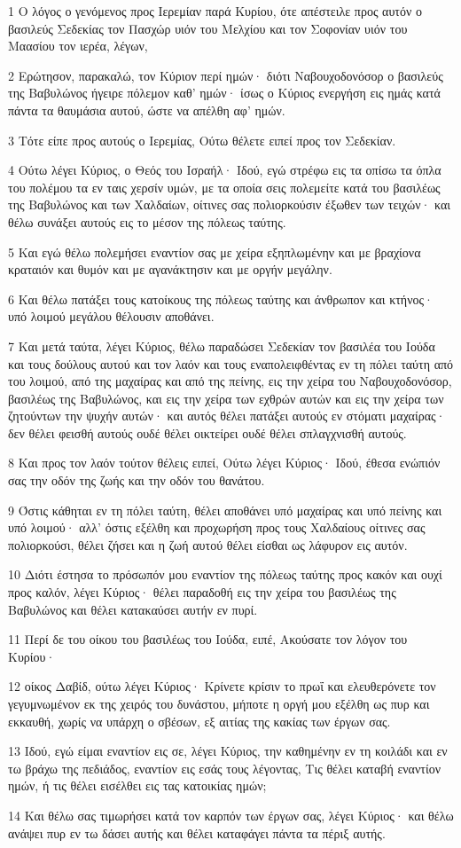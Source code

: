 \par 1 Ο λόγος ο γενόμενος προς Ιερεμίαν παρά Κυρίου, ότε απέστειλε προς αυτόν ο βασιλεύς Σεδεκίας τον Πασχώρ υιόν του Μελχίου και τον Σοφονίαν υιόν του Μαασίου τον ιερέα, λέγων,
\par 2 Ερώτησον, παρακαλώ, τον Κύριον περί ημών· διότι Ναβουχοδονόσορ ο βασιλεύς της Βαβυλώνος ήγειρε πόλεμον καθ' ημών· ίσως ο Κύριος ενεργήση εις ημάς κατά πάντα τα θαυμάσια αυτού, ώστε να απέλθη αφ' ημών.
\par 3 Τότε είπε προς αυτούς ο Ιερεμίας, Ούτω θέλετε ειπεί προς τον Σεδεκίαν.
\par 4 Ούτω λέγει Κύριος, ο Θεός του Ισραήλ· Ιδού, εγώ στρέφω εις τα οπίσω τα όπλα του πολέμου τα εν ταις χερσίν υμών, με τα οποία σεις πολεμείτε κατά του βασιλέως της Βαβυλώνος και των Χαλδαίων, οίτινες σας πολιορκούσιν έξωθεν των τειχών· και θέλω συνάξει αυτούς εις το μέσον της πόλεως ταύτης.
\par 5 Και εγώ θέλω πολεμήσει εναντίον σας με χείρα εξηπλωμένην και με βραχίονα κραταιόν και θυμόν και με αγανάκτησιν και με οργήν μεγάλην.
\par 6 Και θέλω πατάξει τους κατοίκους της πόλεως ταύτης και άνθρωπον και κτήνος· υπό λοιμού μεγάλου θέλουσιν αποθάνει.
\par 7 Και μετά ταύτα, λέγει Κύριος, θέλω παραδώσει Σεδεκίαν τον βασιλέα του Ιούδα και τους δούλους αυτού και τον λαόν και τους εναπολειφθέντας εν τη πόλει ταύτη από του λοιμού, από της μαχαίρας και από της πείνης, εις την χείρα του Ναβουχοδονόσορ, βασιλέως της Βαβυλώνος, και εις την χείρα των εχθρών αυτών και εις την χείρα των ζητούντων την ψυχήν αυτών· και αυτός θέλει πατάξει αυτούς εν στόματι μαχαίρας· δεν θέλει φεισθή αυτούς ουδέ θέλει οικτείρει ουδέ θέλει σπλαγχνισθή αυτούς.
\par 8 Και προς τον λαόν τούτον θέλεις ειπεί, Ούτω λέγει Κύριος· Ιδού, έθεσα ενώπιόν σας την οδόν της ζωής και την οδόν του θανάτου.
\par 9 Όστις κάθηται εν τη πόλει ταύτη, θέλει αποθάνει υπό μαχαίρας και υπό πείνης και υπό λοιμού· αλλ' όστις εξέλθη και προχωρήση προς τους Χαλδαίους οίτινες σας πολιορκούσι, θέλει ζήσει και η ζωή αυτού θέλει είσθαι ως λάφυρον εις αυτόν.
\par 10 Διότι έστησα το πρόσωπόν μου εναντίον της πόλεως ταύτης προς κακόν και ουχί προς καλόν, λέγει Κύριος· θέλει παραδοθή εις την χείρα του βασιλέως της Βαβυλώνος και θέλει κατακαύσει αυτήν εν πυρί.
\par 11 Περί δε του οίκου του βασιλέως του Ιούδα, ειπέ, Ακούσατε τον λόγον του Κυρίου·
\par 12 οίκος Δαβίδ, ούτω λέγει Κύριος· Κρίνετε κρίσιν το πρωΐ και ελευθερόνετε τον γεγυμνωμένον εκ της χειρός του δυνάστου, μήποτε η οργή μου εξέλθη ως πυρ και εκκαυθή, χωρίς να υπάρχη ο σβέσων, εξ αιτίας της κακίας των έργων σας.
\par 13 Ιδού, εγώ είμαι εναντίον εις σε, λέγει Κύριος, την καθημένην εν τη κοιλάδι και εν τω βράχω της πεδιάδος, εναντίον εις εσάς τους λέγοντας, Τις θέλει καταβή εναντίον ημών, ή τις θέλει εισέλθει εις τας κατοικίας ημών;
\par 14 Και θέλω σας τιμωρήσει κατά τον καρπόν των έργων σας, λέγει Κύριος· και θέλω ανάψει πυρ εν τω δάσει αυτής και θέλει καταφάγει πάντα τα πέριξ αυτής.


